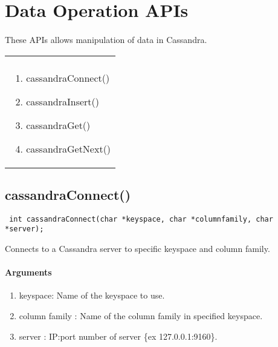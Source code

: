 \documentclass[12 pt , a4paper ]{report}
\begin{document}
\section{Data Operation APIs} 
\paragraph{}These APIs allows  manipulation of data in Cassandra.

\begin{tabular}{ p{7cm} }

    \cellcolor{blue!40}{\bf Data Operation APIs}     \\
 
\cellcolor{blue!40}
\begin{enumerate}
\item cassandraConnect()
   \item cassandraInsert()
   \item cassandraGet()
   \item cassandraGetNext()
   \end{enumerate} 
\end{tabular}







\subsection{cassandraConnect()}
\begin{verbatim}
 int cassandraConnect(char *keyspace, char *columnfamily, char *server);
\end{verbatim}

  Connects to a Cassandra server to specific keyspace and column family.

  \paragraph{Arguments}
  \begin{enumerate}
   \item keyspace: Name of the keyspace to use.
   \item column family : Name of the column family in specified keyspace.
   \item server :       IP:port number of server \{ex 127.0.0.1:9160\}.
  \end{enumerate}
\end{document}
